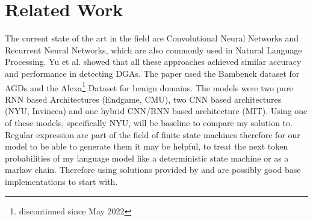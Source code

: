 \documentclass[a4paper, 12pt]{article}
\begin{document}
\section{Related Work}
The current state of the art in the field are Convolutional Neural Networks and Recurrent Neural
Networks, which are also commonly used in Natural Language Processing. Yu et al.
\cite{yuCharacterLevelBased2018} showed that all these approaches achieved similar accuracy and performance
in detecting DGAs.  The paper used the Bambenek dataset \cite{BambenekFeed} for AGDs and the
Alexa\footnote{discontinued since May 2022} Dataset for benign
domains. The models were two pure RNN based Architectures (Endgame, CMU), two CNN based
architectures (NYU, Invincea) and one hybrid CNN/RNN based architecture (MIT). Using one of these
models, specifically NYU, will be baseline to compare my solution to.
Regular expression are part of the field of finite state machines therefore for our model to be able
to generate them it may be helpful, to treat the next token probabilities of my language model like
a deterministic state machine or as a markov chain. Therefore using solutions provided by
\cite{neumannCISC3160Programming} and \cite{beehTransformationsMarkovChains2017} are possibly good
base implementations to start with.
\clearpage

\printbibliography
\end{document}
